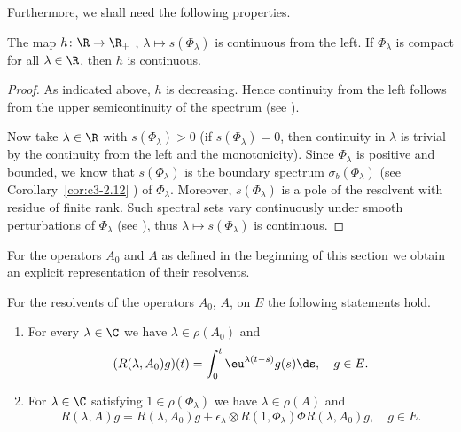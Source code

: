 Furthermore, we shall need the following properties.
\begin{lemma}\label{lem:c4-3.4}
%
The map $h \colon \R \to \R_{+}$ , $\lambda \mapsto s(\Phi_{\lambda})$ is continuous from the left. 
If\/ $\Phi_{\lambda}$ is compact for all $\lambda \in \R$, then $h$ is continuous.
\end{lemma}
\begin{proof}
As indicated above, $h$ is decreasing. Hence continuity from the left follows from the upper semicontinuity of the spectrum (see \textcite[Chapter IV, Theorem~3.1]{kato:1976}).

Now take $\lambda \in \R$ with $s(\Phi_{\lambda}) > 0$ (if\/ $s( \Phi_{\lambda}) = 0$, then continuity in $\lambda$ is trivial by the continuity from the left and the monotonicity). Since $\Phi_{\lambda}$ is positive and bounded, we know that 
$s(\Phi_{\lambda})$ is the boundary spectrum $\sigma_b(\Phi_{\lambda})$ (see Corollary~\ref{cor:c3-2.12} ) of\/ $\Phi_{\lambda}$. Moreover, $s(\Phi_{\lambda})$ is a pole of the resolvent with residue of finite rank. Such spectral sets vary continuously under smooth perturbations of\/ $\Phi_{\lambda}$ (see \textcite[VII.6, Theorem 9]{dunfordschwartz:1958}), thus $\lambda \mapsto s(\Phi_{\lambda})$ is continuous.
\end{proof}
For the operators $A_{0}$ and $A$ as defined in the beginning of this section we obtain an explicit representation of their resolvents.
\begin{lemma}\label{lem:c4-3.5}
For the resolvents of the operators $A_{0}$, \resp $A$, on $E$ the following statements hold.
\begin{enumerate}[\upshape (i)]
\item \label{lem:c4-3.5-1}
For every $\lambda \in \C$ we have $\lambda \in \rho(A_{0})$ and
\begin{equation}\label{eq:c4-3.7}
(R(\lambda,A_{0})g)(t) = \int_{0}^{t} \eu^{\lambda(t-s)}g(s)\ds, \quad g \in E.
\end{equation}
\item \label{lem:c4-3.5-2}
For $\lambda \in \C$ satisfying $1 \in \rho(\Phi_{\lambda})$ we have $\lambda \in \rho(A)$ and
\begin{equation}\label{eq:c4-3.8}
R(\lambda,A)g = R(\lambda,A_{0})g + \epsilon_{\lambda} \otimes R(1,\Phi_{\lambda})\Phi R(\lambda,A_{0})g , \quad g \in E.
\end{equation}
\end{enumerate}
\end{lemma}
